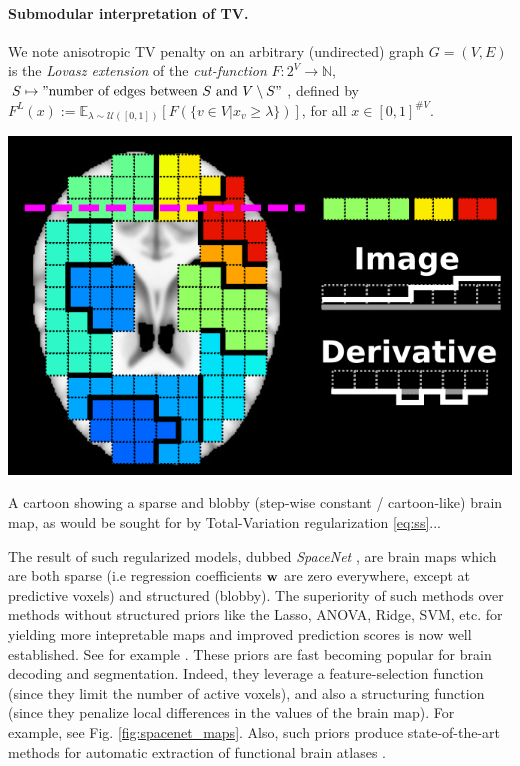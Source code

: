 \begin{mdframed}
  \paragraph{Submodular interpretation of TV.} We note anisotropic TV penalty on
  an arbitrary (undirected) graph $G = (V,E)$ is the \textit{Lovasz extension} of the \textit{cut-function}
  $F : 2^V \rightarrow \mathbb N$, $S \mapsto "\text{number of edges between } S \text{ and }V\setminus S"$,
defined by $F^L(x) := \mathbb E_{\lambda \sim \mathcal U([0,1])}[F(\{v \in V|x_v \ge \lambda\})]$, for all $x \in [0,1]^{\#V}$.
\end{mdframed}
\begin{marginfigure}[4cm]
  \includegraphics[width=1\linewidth]{figures/tv_cartoon_horizontal.png}
  \caption{A cartoon showing a sparse and blobby (step-wise constant / cartoon-like) brain map,
  as would be sought for by Total-Variation regularization \eqref{eq:ss}...}
  \label{fig:roi}
\end{marginfigure}

The result of such regularized models, dubbed \emph{SpaceNet}
 \citep{spacenetohbm}, are brain maps which are both
sparse (i.e regression coefficients $\mathbf{w}$ are zero everywhere, except at
predictive voxels) and structured (blobby). The superiority of such
methods over methods without structured priors like the Lasso, ANOVA,
Ridge, SVM, etc. for yielding more intepretable maps and improved
prediction scores is now well established. See for example
 \citep{baldassarre2012,gramfort2013}. These priors are fast becoming
popular for brain decoding and segmentation. Indeed, they leverage a
feature-selection function
(since they limit the number of active voxels),
and also a structuring function
(since they penalize local
differences in the values of the brain map). For example, see Fig.
\ref{fig:spacenet_maps}.
Also, such priors produce state-of-the-art methods for automatic
extraction of functional brain atlases  \citep{abraham2013}.

